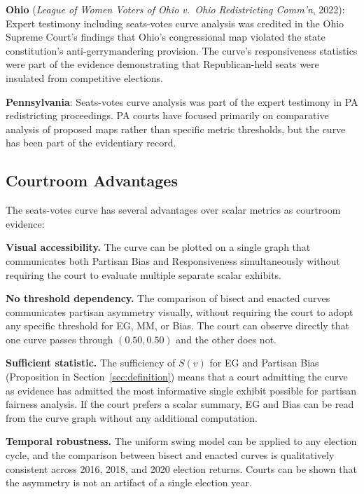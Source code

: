 \textbf{Ohio} (\textit{League of Women Voters of Ohio v.\ Ohio Redistricting Comm'n},
2022): Expert testimony including seats-votes curve analysis was credited in the
Ohio Supreme Court's findings that Ohio's congressional map violated the state
constitution's anti-gerrymandering provision. The curve's responsiveness statistics
were part of the evidence demonstrating that Republican-held seats were insulated
from competitive elections.

\textbf{Pennsylvania}: Seats-votes curve analysis was part of the expert testimony
in PA redistricting proceedings. PA courts have focused primarily on comparative
analysis of proposed maps rather than specific metric thresholds, but the curve
has been part of the evidentiary record.

\subsection{Courtroom Advantages}

The seats-votes curve has several advantages over scalar metrics as courtroom evidence:

\textbf{Visual accessibility.} The curve can be plotted on a single graph that
communicates both Partisan Bias and Responsiveness simultaneously without requiring
the court to evaluate multiple separate scalar exhibits.

\textbf{No threshold dependency.} The comparison of bisect and enacted curves
communicates partisan asymmetry visually, without requiring the court to adopt
any specific threshold for EG, MM, or Bias. The court can observe directly that
one curve passes through $(0.50, 0.50)$ and the other does not.

\textbf{Sufficient statistic.} The sufficiency of $S(v)$ for EG and Partisan Bias
(Proposition in Section~\ref{sec:definition}) means that a court admitting the
curve as evidence has admitted the most informative single exhibit possible for
partisan fairness analysis. If the court prefers a scalar summary, EG and Bias
can be read from the curve graph without any additional computation.

\textbf{Temporal robustness.} The uniform swing model can be applied to any election
cycle, and the comparison between bisect and enacted curves is qualitatively
consistent across 2016, 2018, and 2020 election returns. Courts can be shown
that the asymmetry is not an artifact of a single election year.
